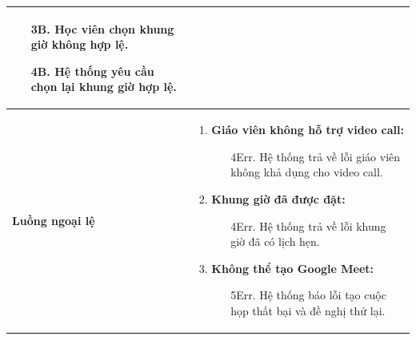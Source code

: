 {\begin{tabularx}{\textwidth}{|>{\raggedright\arraybackslash}p{3.5cm}|>{\raggedright\arraybackslash}X|}
\begin{enumerate}
    \begin{enumerate}
        \item[3B.] Học viên chọn khung giờ không hợp lệ.
        \item[4B.] Hệ thống yêu cầu chọn lại khung giờ hợp lệ.
    \end{enumerate}
\end{enumerate} \\
\hline
\textbf{Luồng ngoại lệ} &
\begin{enumerate}
    \item \textbf{Giáo viên không hỗ trợ video call:}
    \begin{enumerate}
        \item[4Err.] Hệ thống trả về lỗi giáo viên không khả dụng cho video call.
    \end{enumerate}
    \item \textbf{Khung giờ đã được đặt:}
    \begin{enumerate}
        \item[4Err.] Hệ thống trả về lỗi khung giờ đã có lịch hẹn.
    \end{enumerate}
    \item \textbf{Không thể tạo Google Meet:}
    \begin{enumerate}
        \item[5Err.] Hệ thống báo lỗi tạo cuộc họp thất bại và đề nghị thử lại.
    \end{enumerate}
\end{enumerate} \\
\hline
\end{tabularx}
}
